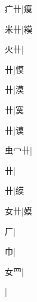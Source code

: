 \begin{multicols}{2}
{{\cjk{}{\cnsym{}　}疒卄}|{\cjk{}瘼}\par
{\cjk{}{\cnsym{}　}米卄}|{\cjk{}糢}\par
{\cjk{}{\cnsym{}　}火卄}|{}\par
{卄}|{\cjk{}慔}\par
{卄}|{\cjk{}漠}\par
{卄}|{\cjk{}寞}\par
{卄}|{\cjk{}谟}\par
{\cjk{}虫{\cnxHanaA{}冖}卄}|{}\par
{卄}|{}\par
{卄}|{\cjk{}縸}\par
{\cjk{}{\cnsym{}　}女卄}|{\cjk{}嫫}\par
{\cjk{}{\cnsym{}　}{\cnsym{}　}厂}|{}\par
{巾}|{}\par
{\cjk{}{\cnsym{}　}女{\cnxHanaA{}罒}}|{}\par
{}|{}\par
}
\end{multicols}
